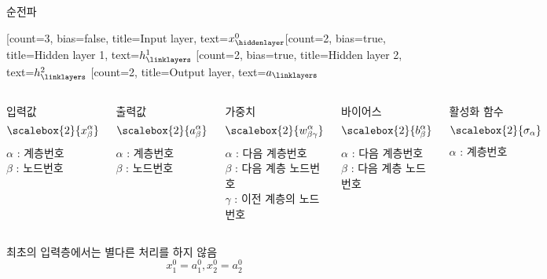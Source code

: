 \documentclass[10pt,t]{beamer}
\newcommand*{\Scale}[2][4]{\scalebox{#1}{\ensuremath{#2}}}%
\begin{document}
\begin{frame}{순전파}

    \begin{center}
    \begin{neuralnetwork}[height=4]
        \newcommand{\xneuralf}[2]{$x^{0}_#2$}
        \newcommand{\y}[2]{$a_#2$}
        \newcommand{\hfirst}[2]{\small $h^{1}_#2$}
        \newcommand{\hsecond}[2]{\small $h^{2}_#2$}
        [count=3, bias=false, title=Input layer, text=\xneuralf]
        \hiddenlayer[count=2, bias=true, title=Hidden layer 1, text=\hfirst] \linklayers
        \hiddenlayer[count=2, bias=true, title=Hidden layer 2, text=\hsecond] \linklayers
        \outputlayer[count=2, title=Output layer, text=\y] \linklayers
    \end{neuralnetwork}
\end{center}
{\footnotesize 
 \begin{columns}
     입력값\\
     \[\Scale[2]{x_{\beta}^{\alpha}}\]
     $\alpha$ : 계층번호\\
     $\beta$ : 노드번호
     
     출력값\\
     \[\Scale[2]{a_{\beta}^{\alpha}}\]
     $\alpha$ : 계층번호\\
     $\beta$ : 노드번호

     가중치\\
     \[\Scale[2]{w_{\beta\gamma}^{\alpha}}\]
     $\alpha$ : 다음 계층번호\\
     $\beta$ : 다음 계층 노드번호\\
     $\gamma$ : 이전 계층의 노드번호
     
     바이어스\\
     \[\Scale[2]{b_{\beta}^{\alpha}}\]
     $\alpha$ : 다음 계층번호\\
     $\beta$ : 다음 계층 노드번호
     
     
     
    활성화 함수\\
    \[\Scale[2]{\sigma_{\alpha}}\] 
    $\alpha$ : 계층번호 
     
     
     
 \end{columns}
 }

 \pagebreak

 최초의 입력층에서는 별다른 처리를 하지 않음
 \[x_{1}^0 = a_1^0, x_{2}^0 = a_2^0\]


\end{frame}
\end{document}
